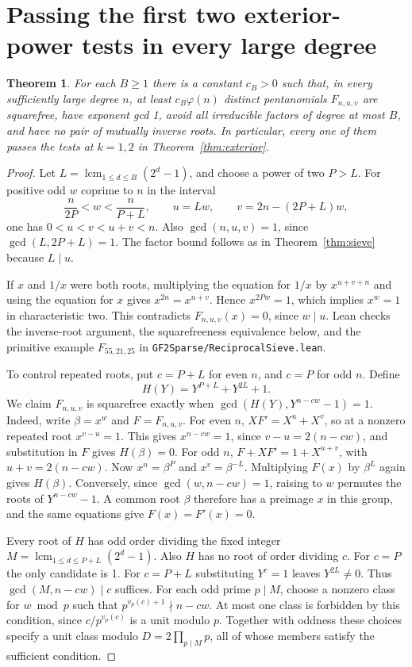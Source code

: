 \documentclass[11pt]{article}
\newtheorem{theorem}{Theorem}
\begin{document}
\section{Passing the first two exterior-power tests in every large degree}
\begin{theorem}\label{thm:reciprocal-sieve}
For each \(B\ge1\) there is a constant \(c_B>0\) such that, in every
sufficiently large degree \(n\), at least \(c_B\varphi(n)\) distinct pentanomials \(F_{n,u,v}\)
are squarefree, have exponent gcd 1, avoid all irreducible factors
of degree at most \(B\), and have no pair of mutually inverse roots.
In particular, every one of them passes the tests at \(k=1,2\) in
Theorem~\ref{thm:exterior}.
\end{theorem}
\begin{proof}
Let \(L=\operatorname{lcm}_{1\le d\le B}(2^d-1)\), and choose a
power of two \(P>L\). For positive odd \(w\) coprime to \(n\) in the
interval
\[
 \frac{n}{2P}<w<\frac{n}{P+L},
 \qquad u=Lw,\qquad v=2n-(2P+L)w,
\]
one has \(0<u<v<u+v<n\). Also \(\gcd(n,u,v)=1\), since
\(\gcd(L,2P+L)=1\). The factor bound follows as in
Theorem~\ref{thm:sieve} because \(L\mid u\).

If \(x\) and \(1/x\) were both roots, multiplying the equation
for \(1/x\) by \(x^{u+v+n}\) and using the equation for \(x\) gives
\(x^{2n}=x^{u+v}\). Hence \(x^{2Pw}=1\), which implies \(x^w=1\)
in characteristic two. This contradicts \(F_{n,u,v}(x)=0\),
since \(w\mid u\). Lean checks the inverse-root argument, the
squarefreeness equivalence below, and the primitive example \(F_{55,21,25}\) in \texttt{GF2Sparse/ReciprocalSieve.lean}.

To control repeated roots, put \(c=P+L\) for even \(n\), and \(c=P\)
for odd \(n\). Define
\[
               H(Y)=Y^{P+L}+Y^{2L}+1 .
\]
We claim \(F_{n,u,v}\) is squarefree exactly when
\(\gcd(H(Y),Y^{n-cw}-1)=1\).
Indeed, write \(\beta=x^w\) and \(F=F_{n,u,v}\). For even \(n\),
\(XF'=X^u+X^v\), so at a nonzero repeated root \(x^{v-u}=1\).
This gives \(x^{n-cw}=1\), since \(v-u=2(n-cw)\), and substitution
in \(F\) gives \(H(\beta)=0\). For odd \(n\),
\(F+XF'=1+X^{u+v}\), with \(u+v=2(n-cw)\). Now \(x^n=\beta^P\)
and \(x^v=\beta^{-L}\). Multiplying \(F(x)\) by \(\beta^L\) again
gives \(H(\beta)\). Conversely, since \(\gcd(w,n-cw)=1\),
raising to \(w\) permutes the roots of \(Y^{n-cw}-1\). A common
root \(\beta\) therefore has a preimage \(x\) in this group, and the
same equations give \(F(x)=F'(x)=0\).

Every root of \(H\) has odd order dividing the fixed integer
\(M=\operatorname{lcm}_{1\le d\le P+L}(2^d-1)\).
Also \(H\) has no root of order dividing \(c\). For \(c=P\) the
only candidate is 1. For \(c=P+L\) substituting \(Y^c=1\) leaves
\(Y^{2L}\ne0\). Thus \(\gcd(M,n-cw)\mid c\) suffices.
For each odd prime \(p\mid M\), choose a nonzero class for \(w\bmod p\)
such that \(p^{v_p(c)+1}\nmid n-cw\). At most one class is forbidden
by this condition, since \(c/p^{v_p(c)}\) is a unit modulo \(p\).
Together with oddness these choices specify a unit class modulo
\(D=2\prod_{p\mid M}p\), all of whose members satisfy the sufficient
condition.


\end{proof}
\end{document}
